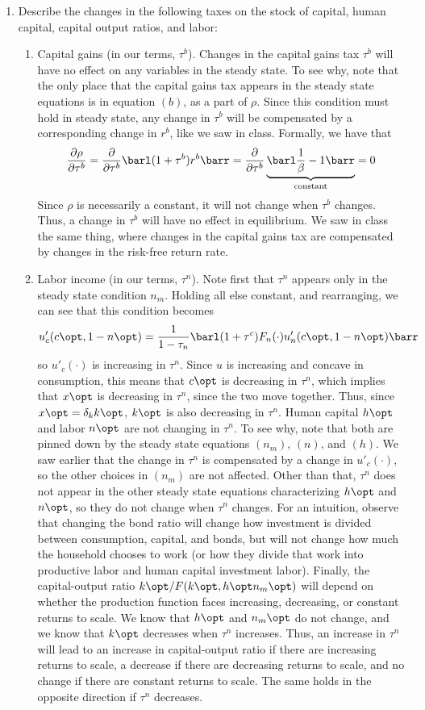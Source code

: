 \documentclass[10pt]{article}
\begin{document}
\begin{enumerate}
	\item Describe the changes in the following taxes on the stock of capital, human capital, capital output ratios, and labor: \begin{enumerate} \item Capital gains (in our terms, $\tau^b$). Changes in the capital gains tax $\tau^b$ will have no effect on any variables in the steady state. To see why, note that the only place that the capital gains tax appears in the steady state equations is in equation $(b)$, as a part of $\rho$. Since this condition must hold in steady state, any change in $\tau^b$ will be compensated by a corresponding change in $r^b$, like we saw in class. Formally, we have that \[\frac{\partial\rho}{\partial \tau^b} = \frac{\partial }{\partial \tau^b}\barl (1+\tau^b)r^b\barr = \frac{\partial}{\partial \tau^b} \underbrace{\barl \frac{1}{\beta} - 1\barr}_{\text{constant}} = 0\]Since $\rho$ is necessarily a constant, it will not change when $\tau^b$ changes. Thus, a change in $\tau^b$ will have no effect in equilibrium. We saw in class the same thing, where changes in the capital gains tax are compensated by changes in the risk-free return rate. \item Labor income (in our terms, $\tau^n$). Note first that $\tau^n$ appears only in the steady state condition $n_m$. Holding all else constant, and rearranging, we can see that this condition becomes\[u'_c(c\opt,1-n\opt) = \frac{1}{1-\tau_n} \barl (1+\tau^c)F_n(\cdot) u'_n(c\opt,1-n\opt)\barr\]so $u'_c(\cdot)$ is increasing in $\tau^n$. Since $u$ is increasing and concave in consumption, this means that $c\opt$ is decreasing in $\tau^n$, which implies that $x\opt$ is decreasing in $\tau^n$, since the two move together. Thus, since $x\opt = \delta_kk\opt$, $k\opt$ is also decreasing in $\tau^n$. Human capital $h\opt$ and labor $n\opt$ are not changing in $\tau^n$. To see why, note that both are pinned down by the steady state equations $(n_m)$, $(n)$, and $(h)$. We saw earlier that the change in $\tau^n$ is compensated by a change in $u'_c(\cdot)$, so the other choices in $(n_m)$ are not affected. Other than that, $\tau^n$ does not appear in the other steady state equations characterizing $h\opt$ and $n\opt$, so they do not change when $\tau^n$ changes. For an intuition, observe that changing the bond ratio will change how investment is divided between consumption, capital, and bonds, but will not change how much the household chooses to work (or how they divide that work into productive labor and human capital investment labor). Finally, the capital-output ratio $k\opt / F(k\opt,h\opt n_m\opt)$ will depend on whether the production function faces increasing, decreasing, or constant returns to scale. We know that $h\opt$ and $n_m\opt$ do not change, and we know that $k\opt$ decreases when $\tau^n$ increases. Thus, an increase in $\tau^n$ will lead to an increase in capital-output ratio if there are increasing returns to scale, a decrease if there are decreasing returns to scale, and no change if there are constant returns to scale. The same holds in the opposite direction if $\tau^n$ decreases. \end{enumerate}

\end{enumerate}
\end{document}

